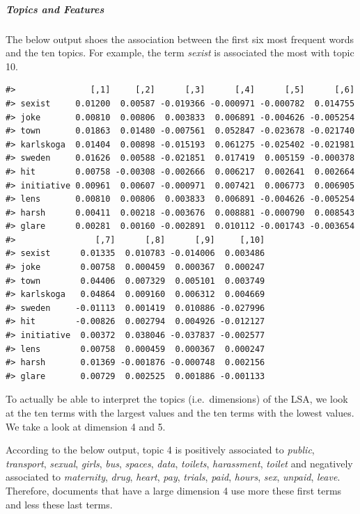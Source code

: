 \documentclass[
]{article}
\begin{document}
\hypertarget{topics-and-features}{%
\subparagraph{Topics and Features}\label{topics-and-features}}

The below output shoes the association between the first six most
frequent words and the ten topics. For example, the term \emph{sexist}
is associated the most with topic 10.

\begin{verbatim}
#>               [,1]     [,2]      [,3]      [,4]      [,5]      [,6]
#> sexist     0.01200  0.00587 -0.019366 -0.000971 -0.000782  0.014755
#> joke       0.00810  0.00806  0.003833  0.006891 -0.004626 -0.005254
#> town       0.01863  0.01480 -0.007561  0.052847 -0.023678 -0.021740
#> karlskoga  0.01404  0.00898 -0.015193  0.061275 -0.025402 -0.021981
#> sweden     0.01626  0.00588 -0.021851  0.017419  0.005159 -0.000378
#> hit        0.00758 -0.00308 -0.002666  0.006217  0.002641  0.002664
#> initiative 0.00961  0.00607 -0.000971  0.007421  0.006773  0.006905
#> lens       0.00810  0.00806  0.003833  0.006891 -0.004626 -0.005254
#> harsh      0.00411  0.00218 -0.003676  0.008881 -0.000790  0.008543
#> glare      0.00281  0.00160 -0.002891  0.010112 -0.001743 -0.003654
#>                [,7]      [,8]      [,9]     [,10]
#> sexist      0.01335  0.010783 -0.014006  0.003486
#> joke        0.00758  0.000459  0.000367  0.000247
#> town        0.04406  0.007329  0.005101  0.003749
#> karlskoga   0.04864  0.009160  0.006312  0.004669
#> sweden     -0.01113  0.001419  0.010886 -0.027996
#> hit        -0.00826  0.002794  0.004926 -0.012127
#> initiative  0.00372  0.038046 -0.037837 -0.002577
#> lens        0.00758  0.000459  0.000367  0.000247
#> harsh       0.01369 -0.001876 -0.000748  0.002156
#> glare       0.00729  0.002525  0.001886 -0.001133
\end{verbatim}

To actually be able to interpret the topics (i.e.~dimensions) of the
LSA, we look at the ten terms with the largest values and the ten terms
with the lowest values. We take a look at dimension 4 and 5.

According to the below output, topic 4 is positively associated to
\emph{public}, \emph{transport}, \emph{sexual}, \emph{girls},
\emph{bus}, \emph{spaces}, \emph{data}, \emph{toilets},
\emph{harassment}, \emph{toilet} and negatively associated to
\emph{maternity}, \emph{drug}, \emph{heart}, \emph{pay}, \emph{trials},
\emph{paid}, \emph{hours}, \emph{sex}, \emph{unpaid}, \emph{leave}.
Therefore, documents that have a large dimension 4 use more these first
terms and less these last terms.
\end{document}
